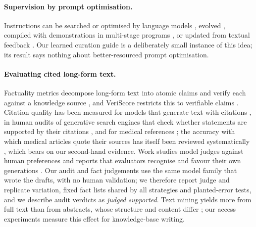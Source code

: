 \documentclass{article} %
\begin{document}
\paragraph{Supervision by prompt optimisation.}
Instructions can be searched or optimised by language models \citep{Zhou2022LargeLanguage,Pryzant2023AutomaticPrompt,Yang2023LargeLanguage}, evolved \citep{Guo2023EvopromptConnecting,Fernando2023PromptbreederSelfreferential,agrawal2026gepa}, compiled with demonstrations in multi-stage programs \citep{Khattab2023DspyCompiling,Opsahlong2024OptimizingInstructions}, or updated from textual feedback \citep{Yuksekgonul2024TextgradAutomatic}. Our learned curation guide is a deliberately small instance of this idea; its result says nothing about better-resourced prompt optimisation.

\paragraph{Evaluating cited long-form text.}
Factuality metrics decompose long-form text into atomic claims and verify each against a knowledge source \citep{min2023factscore,wei2024longform}, and VeriScore restricts this to verifiable claims \citep{Song2024VeriscoreEvaluating}. Citation quality has been measured for models that generate text with citations \citep{gao2023enabling}, in human audits of generative search engines that check whether statements are supported by their citations \citep{Liu2023EvaluatingVerifiability}, and for medical references \citep{wu2025automated}; the accuracy with which medical articles quote their sources has itself been reviewed systematically \citep{jergas2015quotation}, which bears on our second-hand evidence. Work studies model judges against human preferences \citep{zheng2023judging,shankar2024who} and reports that evaluators recognise and favour their own generations \citep{panickssery2024llm}. Our audit and fact judgements use the same model family that wrote the drafts, with no human validation; we therefore report judge and replicate variation, fixed fact lists shared by all strategies and planted-error tests, and we describe audit verdicts as \emph{judged supported}. Text mining yields more from full text than from abstracts, whose structure and content differ \citep{Cohen2010StructuralContent,Westergaard2018ComprehensiveQuantitative}; our access experiments measure this effect for knowledge-base writing.
\end{document}
